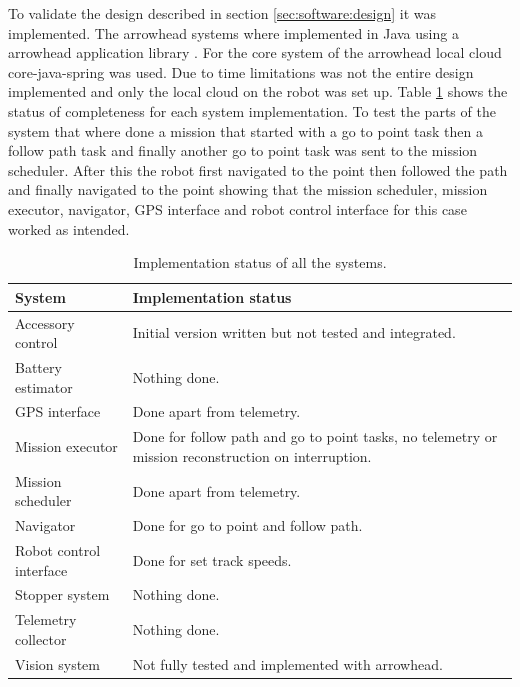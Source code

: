 \documentclass{article}
\begin{document}
To validate the design described in section \ref{sec:software:design} it was implemented.
The arrowhead systems where implemented in Java using a arrowhead application library \cite{arrowheadlib}.
For the core system of the arrowhead local cloud core-java-spring \cite{arrowheadcore} was used.
Due to time limitations was not the entire design implemented and only the local cloud on the robot was set up.
Table \ref{tab:implementation_status} shows the status of completeness for each system implementation. To test the parts of the system that where done a mission that started with a go to point task then a follow path task and finally another go to point task was sent to the mission scheduler. After this the robot first navigated to the point then followed the path and finally navigated to the point showing that the mission scheduler, mission executor, navigator, GPS interface and robot control interface for this case worked as intended.
\begin{table}
    \centering
    \begin{tabular}{|l|p{8cm}|}
        \hline
        System & Implementation status \\
        \hline
        \hline
        Accessory control & Initial version written but not tested and integrated. \\
        \hline
        Battery estimator & Nothing done. \\
        \hline
        GPS interface & Done apart from telemetry. \\
        \hline
        Mission executor & Done for follow path and go to point tasks, no telemetry or mission reconstruction on interruption. \\
        \hline
        Mission scheduler & Done apart from telemetry. \\
        \hline
        Navigator & Done for go to point and follow path. \\
        \hline
        Robot control interface & Done for set track speeds. \\
        \hline
        Stopper system & Nothing done. \\
        \hline
        Telemetry collector & Nothing done. \\
        \hline
        Vision system & Not fully tested and implemented with arrowhead. \\
        \hline
    \end{tabular}
    \caption{Implementation status of all the systems.}
    \label{tab:implementation_status}
\end{table}
\end{document}

